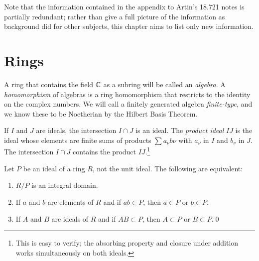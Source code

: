 \documentclass{report}
\begin{document}
Note that the information contained in the appendix to Artin's 18.721 notes is partially redundant; rather than give a full picture of the information as background did for other subjects, this chapter aims to list only new information.

\section{Rings}
A ring that contains the field $\mathbb{C}$ as a subring will be called an \emph{algebra}. 
A \emph{homomorphism} of algebras is a ring homomorphism that restricts to the identity on the complex numbers.
We will call a finitely generated algebra \emph{finite-type}, and we know these to be Noetherian by the Hilbert Basis Theorem.

If $I$ and $J$ are ideals, the intersection $I \cap J$ is an ideal.
The \emph{product ideal} $IJ$ is the ideal whose elements are finite sums of products $\sum a_\nu b\nu$ with $a_\nu$ in $I$ and $b_\nu$ in $J$.
The intersection $I \cap J$ contains the product $IJ$.\footnote{This is easy to verify; the absorbing property and closure under addition works simultaneously on both ideals.}

\begin{lemma}
  Let $P$ be an ideal of a ring $R$, not the unit ideal.
  The following are equivalent:
  \begin{enumerate}[label=(\textbf{\roman*})]
    \item $R/P$ is an integral domain.
    \item If $a$ and $b$ are elements of $R$ and if $ab \in P$, then $a \in P$ or $b \in P$.
    \item If $A$ and $B$ are ideals of $R$ and if $AB \subset P$, then $A \subset P$ or $B \subset P$.\qed
  \end{enumerate}
\end{lemma}
\end{document}
